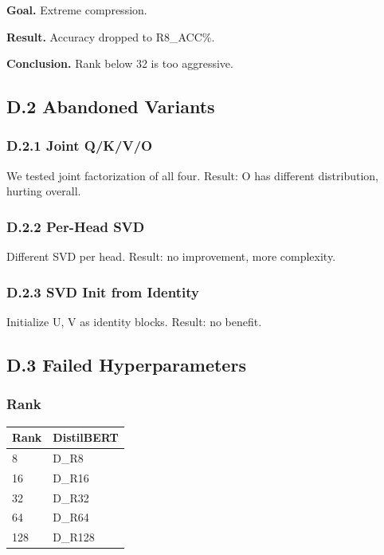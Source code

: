 \textbf{Goal.} Extreme compression.

\textbf{Result.} Accuracy dropped to {{R8\_ACC}}\%.

\textbf{Conclusion.} Rank below 32 is too aggressive.

\subsection{D.2 Abandoned Variants}

\subsubsection{D.2.1 Joint Q/K/V/O}

We tested joint factorization of all four. Result: O has different 
distribution, hurting overall.

\subsubsection{D.2.2 Per-Head SVD}

Different SVD per head. Result: no improvement, more complexity.

\subsubsection{D.2.3 SVD Init from Identity}

Initialize U, V as identity blocks. Result: no benefit.

\subsection{D.3 Failed Hyperparameters}

\subsubsection{Rank}

\begin{table}[H]
\centering
\small
\begin{tabular}{ll}
\toprule
\textbf{Rank} & \textbf{DistilBERT} \\
\midrule
8 & {{D\_R8}} \\
16 & {{D\_R16}} \\
32 & {{D\_R32}} \\
64 & {{D\_R64}} \\
128 & {{D\_R128}} \\
\bottomrule
\end{tabular}
\end{table}

